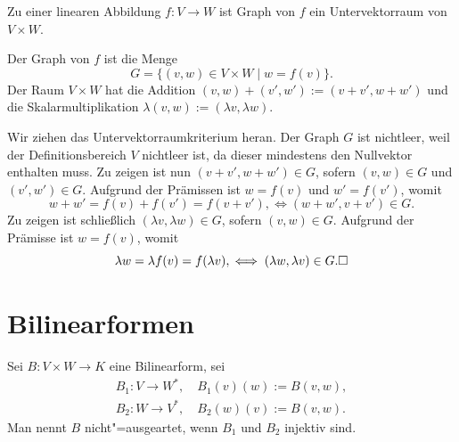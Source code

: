 \begin{Korollar}
Zu einer linearen Abbildung $f\colon V\to W$ ist Graph von $f$
ein Untervektorraum von $V\times W$.
\end{Korollar}
\begin{Beweis}
Der Graph von $f$ ist die Menge
\[G = \{(v,w)\in V\times W\mid w=f(v)\}.\]
Der Raum $V\times W$ hat die Addition $(v,w)+(v',w'):=(v+v',w+w')$ und
die Skalarmultiplikation $\lambda (v,w) := (\lambda v,\lambda w)$.

Wir ziehen das Untervektorraumkriterium heran. Der Graph $G$ ist
nichtleer, weil der Definitionsbereich $V$ nichtleer ist, da dieser
mindestens den Nullvektor enthalten muss. Zu zeigen ist nun
$(v+v',w+w')\in G$, sofern $(v,w)\in G$ und $(v',w')\in G$. Aufgrund
der Prämissen ist $w=f(v)$ und $w'=f(v')$, womit
\[w+w' = f(v)+f(v') = f(v+v'), \iff (w+w',v+v')\in G.\]
Zu zeigen ist schließlich $(\lambda v,\lambda w)\in G$, sofern
$(v,w)\in G$. Aufgrund der Prämisse ist $w=f(v)$, womit
\[\lambda w = \lambda f(v) = f(\lambda v), \iff (\lambda w,\lambda v)\in G.\square\]
\end{Beweis}

\newpage
\section{Bilinearformen}

\begin{Definition}%
\label{def:degenerate}\newlinefirst
Sei $B\colon V\times W\to K$ eine Bilinearform, sei
\begin{align*}
B_1\colon V\to W^*,\quad B_1(v)(w):=B(v,w),\\
B_2\colon W\to V^*,\quad B_2(w)(v):=B(v,w).
\end{align*}
Man nennt $B$ nicht"=ausgeartet, wenn $B_1$ und $B_2$ injektiv sind.
\end{Definition}

